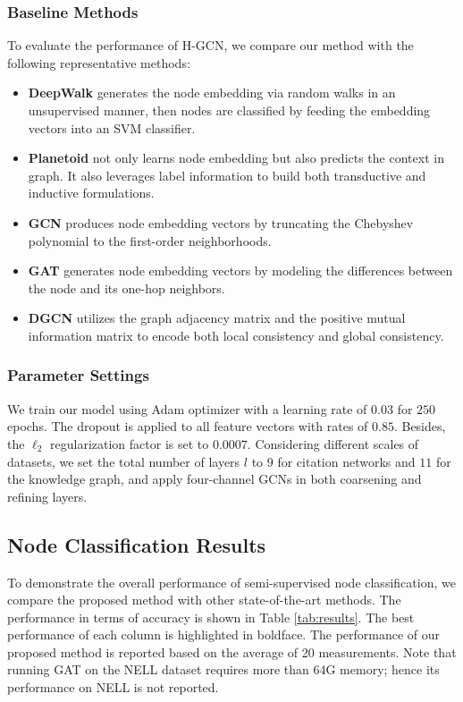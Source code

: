 \documentclass{article}
\begin{document}
\subsubsection{Baseline Methods}

To evaluate the performance of H-GCN, we compare our method with the following representative methods:

\begin{itemize}
	\item {\bf DeepWalk} \cite{Perozzi:2014:DOL:2623330.2623732} generates the node embedding via random walks in an unsupervised manner, then nodes are classified by feeding the embedding vectors into an SVM classifier.
	\item {\bf Planetoid} \cite{pmlr-v48-yanga16} not only learns node embedding but also predicts the context in graph. It also leverages label information to build both transductive and inductive formulations.
	\item {\bf GCN} \cite{Kipf:2016tc} produces node embedding vectors by truncating the Chebyshev polynomial to the first-order neighborhoods.
	\item {\bf GAT} \cite{Velickovic:2018we} generates node embedding vectors by modeling the differences between the node and its one-hop neighbors.
	\item {\bf DGCN} \cite{Zhuang:2018:DGC:3178876.3186116} utilizes the graph adjacency matrix and the positive mutual information matrix to encode both local consistency and global consistency.
\end{itemize}

\subsubsection{Parameter Settings}

We train our model using Adam optimizer with a learning rate of $0.03$ for $250$ epochs. The dropout is applied to all feature vectors with rates of $0.85$. Besides, the $\ell_2$ regularization factor is set to $0.0007$. Considering different scales of datasets, we set the total number of layers $l$ to $9$ for citation networks and $11$ for the knowledge graph, and apply four-channel GCNs in both coarsening and refining layers.

\subsection{Node Classification Results}

To demonstrate the overall performance of semi-supervised node classification, we compare the proposed method with other state-of-the-art methods. The performance in terms of accuracy is shown in Table \ref{tab:results}. The best performance of each column is highlighted in boldface. The performance of our proposed method is reported based on the average of 20 measurements. Note that running GAT on the NELL dataset requires more than 64G memory; hence its performance on NELL is not reported.
\end{document}
